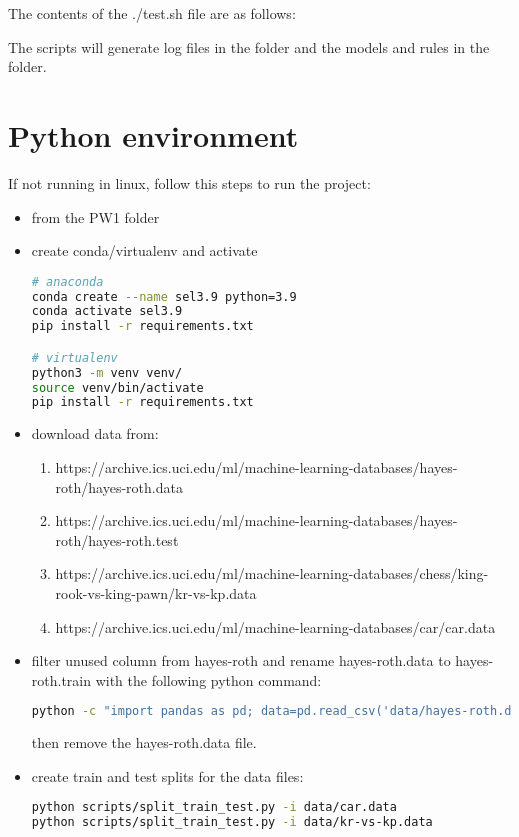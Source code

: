 The contents of the ./test.sh file are as follows:



The scripts will generate log files in the  folder and the models and rules in the  folder.

\section{Python environment}

If not running in linux, follow this steps to run the project:

\begin{itemize}
    \item from the PW1 folder
    \item create conda/virtualenv and activate
    \begin{lstlisting}[language=bash]
# anaconda
conda create --name sel3.9 python=3.9
conda activate sel3.9
pip install -r requirements.txt

# virtualenv
python3 -m venv venv/
source venv/bin/activate
pip install -r requirements.txt
    \end{lstlisting}
    \item download data from:
    \begin{enumerate}
        \item https://archive.ics.uci.edu/ml/machine-learning-databases/hayes-roth/hayes-roth.data
        \item https://archive.ics.uci.edu/ml/machine-learning-databases/hayes-roth/hayes-roth.test
        \item https://archive.ics.uci.edu/ml/machine-learning-databases/chess/king-rook-vs-king-pawn/kr-vs-kp.data
        \item https://archive.ics.uci.edu/ml/machine-learning-databases/car/car.data
    \end{enumerate}
    \item filter unused column from hayes-roth and rename hayes-roth.data to hayes-roth.train with the following python command:
    \begin{lstlisting}[language=bash]
python -c "import pandas as pd; data=pd.read_csv('data/hayes-roth.data'); data=data.drop('name', axis=1); data.to_csv('data/hayes-roth.train', index=False)"
    \end{lstlisting}
    then remove the hayes-roth.data file.
    \item create train and test splits for the data files:
    \begin{lstlisting}[language=bash]
python scripts/split_train_test.py -i data/car.data
python scripts/split_train_test.py -i data/kr-vs-kp.data
    \end{lstlisting}
\end{itemize}

